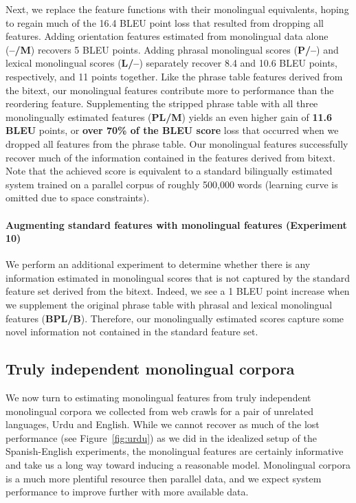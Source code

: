 \documentclass[11pt]{article}
\newcommand{\figref}[1]{Figure~\ref{#1}}
\begin{document}
Next, we replace the feature functions with their monolingual equivalents, hoping to regain much of the 16.4 BLEU point loss that resulted from dropping all features.  Adding orientation features estimated from monolingual data alone ({\bf --/M})  recovers 5 BLEU points. Adding phrasal monolingual scores ({\bf P/--}) and lexical monolingual scores ({\bf L/--}) separately recover 8.4 and 10.6 BLEU points, respectively, and 11 points together. Like the phrase table features derived from the bitext, our monolingual features contribute more to performance than the reordering feature. Supplementing the stripped phrase table with all three monolingually estimated features ({\bf PL/M}) yields an even higher gain of {\bf 11.6 BLEU} points, or {\bf over 70\% of the BLEU score} loss that occurred when we dropped all features from the phrase table. Our monolingual features successfully recover much of the information contained in the features derived from bitext.  Note that the achieved score is equivalent to a standard bilingually estimated system trained on a parallel corpus of roughly 500,000 words (learning curve is omitted due to space constraints).

\paragraph{Augmenting standard features with monolingual features (Experiment 10)} \label{sect:exp:augment}
We perform an additional experiment to determine whether there is any information estimated in monolingual scores that is not captured by the standard feature set derived from the bitext. Indeed, we see a 1 BLEU point increase when we supplement the original phrase table with phrasal and lexical monolingual features ({\bf BPL/B}). Therefore, our monolingually estimated scores capture some novel information not contained in the standard feature set.

\subsection{Truly independent monolingual corpora} \label{sect:exp:indep}

We now turn to estimating monolingual features from truly independent monolingual corpora we collected from web crawls for a pair of unrelated languages, Urdu and English.  While we cannot recover as much of the lost performance (see \figref{fig:urdu}) as we did in the idealized setup of the Spanish-English experiments, the monolingual features are certainly informative and take us a long way toward inducing a reasonable model.  Monolingual corpora is a much more plentiful resource then parallel data, and we expect system performance to improve further with more available data.
\end{document}
